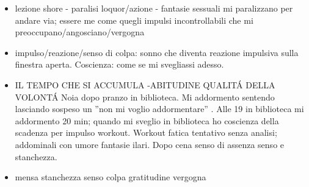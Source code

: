 \begin{itemize}
Descrizione condizione ragazzo mi passa avanti a mensa: non analisi psicologica ma in-se-per-se (capacit\'a interazioni annullate come appena sveglio, impulso rabbia innato come le mattane di quando ero piccolo, loquor elementare, essere me come acceso/spento
\item lezione shore - paralisi loquor/azione - fantasie sessuali mi paralizzano per andare via; essere me come quegli impulsi incontrollabili che mi preoccupano/angosciano/vergogna
\item impulso/reazione/senso di colpa: sonno che diventa reazione impulsiva sulla finestra aperta. Coscienza: come se mi svegliassi adesso.
\item IL TEMPO CHE SI ACCUMULA -ABITUDINE QUALIT\'A DELLA VOLONT\'A
Noia dopo pranzo in biblioteca. Mi addormento sentendo lasciando sospeso un ''non mi voglio addormentare'' . Alle 19 in biblioteca mi addormento 20 min; quando mi sveglio in biblioteca ho coscienza della scadenza per impulso workout.
Workout fatica tentativo senza analisi; addominali con umore fantasie ilari.
Dopo cena senso di assenza senso e stanchezza.
\item mensa stanchezza senso colpa gratitudine vergogna
\end{itemize}